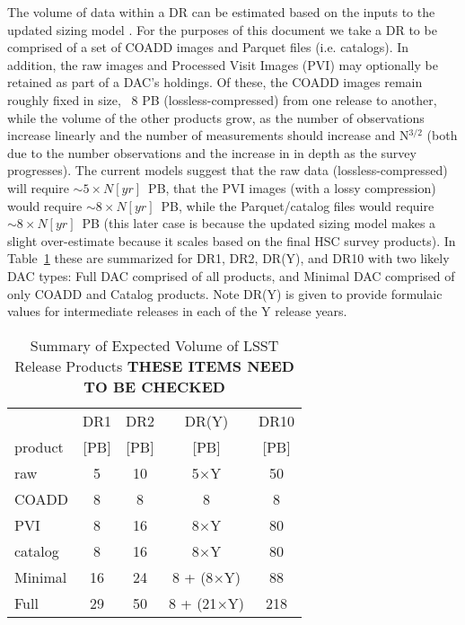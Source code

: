 The volume of data within a DR can be estimated based on the inputs to the updated sizing 
model .  For the purposes of this document we take a DR to be comprised 
of a set of COADD images and Parquet files (i.e. catalogs).  In addition, the raw images 
and Processed Visit Images (PVI) may optionally be retained as part of a DAC's holdings.  
Of these, the COADD images remain roughly fixed in size, ~8 PB (lossless-compressed) from 
one release to another, while the volume of the other products grow, as the number of 
observations increase linearly and the number of measurements should increase and N$^{3/2}$ 
(both due to the number observations and the increase in in depth as the survey progresses).  
The current models suggest that the raw data (lossless-compressed) will require 
$\sim 5\times N[yr]$~PB, that the PVI images (with a lossy compression) would require 
$\sim 8\times N[yr]$~PB, while the Parquet/catalog files would require $\sim 8\times N[yr]$~PB 
(this later case is because the updated sizing model makes a slight over-estimate because it 
scales based on the final HSC survey products).  In Table~\ref{tab_volume} these are summarized 
for DR1, DR2, DR(Y), and DR10 with two likely DAC types: Full DAC comprised of all products, 
and Minimal DAC comprised of only COADD and Catalog products.  Note DR(Y) is given to provide 
formulaic values for intermediate releases in each of the Y release years.

\begin{table}[!ht]
\caption{Summary of Expected Volume of LSST Release Products {\bf THESE ITEMS NEED TO BE CHECKED }}
\label{tab_volume}
\footnotesize
\centering
\begin{tabular}[]{|l|cccc|}
\hline
\hline
            &   DR1  &  DR2   &  DR(Y)  &  DR10 \\
 product    &  [PB]  &  [PB]  &  [PB]   &  [PB] \\
\hline
 raw        &    5   &   10   &  5$\times$Y    &   50   \\
 COADD      &    8   &    8   &    8           &    8   \\
 PVI        &    8   &   16   &  8$\times$Y    &   80   \\
 catalog    &    8   &   16   &  8$\times$Y    &   80   \\
\hline
 Minimal    &   16   &   24   &  8 + (8$\times$Y) &   88   \\
 Full       &   29   &   50   &  8 + (21$\times$Y) &  218  \\
\hline
\end{tabular}
\end{table}


